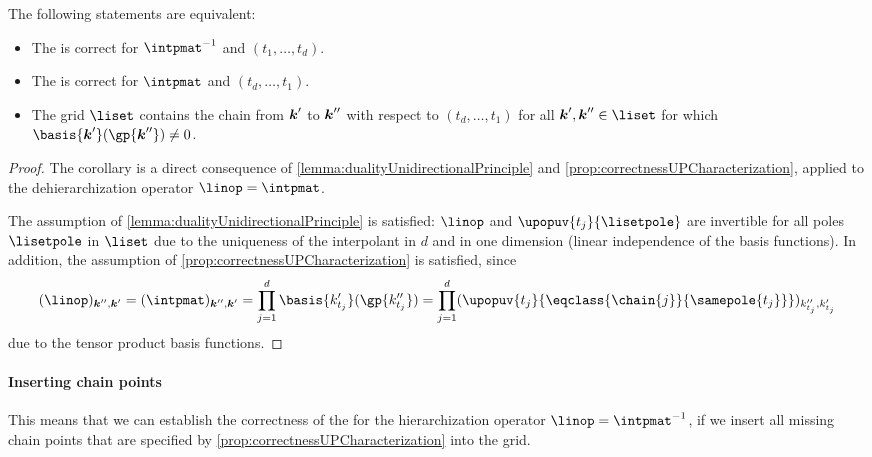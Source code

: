 \begin{corollary}
  \label{cor:equivalentCorrectnessUPHierarchization}
  The following statements are equivalent:
  \begin{itemize}
    \item
    The \up is correct for $\intpmatinv$ and $(t_1, \dotsc, t_d)$.
    
    \item
    The \up is correct for $\intpmat$ and $(t_d, \dotsc, t_1)$.
    
    \item
    The grid $\liset$ contains the chain from ${\boldsymbol{k}}'$ to ${\boldsymbol{k}}''$
    with respect to $(t_d, \dotsc, t_1)$ for all $\*k', \*k'' \in \liset$
    for which $\basis{\*k'}(\gp{\*k''}) \not= 0$.
  \end{itemize}
\end{corollary}

\begin{proof}
  The corollary is a direct consequence of
  \cref{lemma:dualityUnidirectionalPrinciple} and
  \cref{prop:correctnessUPCharacterization},
  applied to the dehierarchization operator $\linop = \intpmat$.
  
  The assumption of \cref{lemma:dualityUnidirectionalPrinciple}
  is satisfied:
  $\linop$ and $\upopuv{t_j}{\lisetpole}$ are invertible
  for all poles $\lisetpole$ in $\liset$
  due to the uniqueness of the interpolant in $d$ and in one dimension
  (linear independence of the basis functions).
  In addition, the assumption of \cref{prop:correctnessUPCharacterization}
  is satisfied, since
  \begin{equation}
    (\linop)_{\*k'',\*k'}
    = (\intpmat)_{\*k'',\*k'}
    = \prod_{j=1}^d \basis{k'_{t_j}}(\gp{k''_{t_j}})
    = \prod_{j=1}^d
    (\upopuv{t_j}{\eqclass{\chain{j}}{\samepole{t_j}}})_{k''_{t_j},k'_{t_j}}
  \end{equation}
  due to the tensor product basis functions.
\end{proof}

\paragraph{Inserting chain points}

This means that we can establish the correctness of the \up
for the hierarchization operator $\linop = \intpmatinv$,
if we insert all missing chain points that are specified by
\cref{prop:correctnessUPCharacterization} into the grid.

